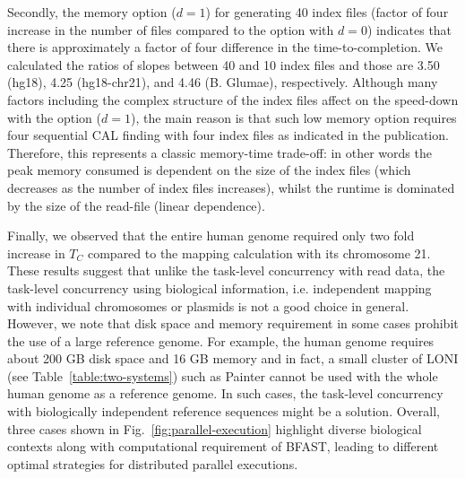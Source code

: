 \documentclass{cpeauth}
\begin{document}

Secondly, the memory option ($d=1$) for generating 40 index files
(factor of four increase in the number of files compared to the option with $d=0$) indicates that there is
approximately a factor of four difference in the time-to-completion.
We calculated the ratios of slopes between 40 and 10 index files and
those are 3.50 (hg18), 4.25 (hg18-chr21), and 4.46 (B. Glumae),
respectively.  
Although many factors including the complex structure of the index
files affect on the speed-down with the option ($d=1$), the main
reason is that such low memory option requires four sequential CAL
finding with four index files as indicated in the
publication\cite{bfast2009}.  Therefore, this represents a classic
memory-time trade-off: in other words the peak memory consumed is
dependent on the size of the index files (which decreases as the
number of index files increases), whilst the runtime is dominated by
the size of the read-file (linear dependence).

Finally, we observed that the entire human genome required only two fold increase in $T_C$ compared to the mapping calculation with its chromosome 21.  These results suggest that unlike the task-level concurrency with read data, the task-level concurrency using biological information, i.e. independent mapping with individual chromosomes or plasmids is not a good choice in general. However, we note that disk space and memory requirement in some cases prohibit the use of a large reference genome.  For example, the human genome requires about 200 GB disk space and 16 GB memory and in fact, a small cluster of LONI (see Table~\ref{table:two-systems}) such as Painter cannot be used with the whole human genome as a reference genome.   In such cases, the task-level concurrency with biologically independent reference sequences might be a solution.   Overall, three cases shown in
Fig.~\ref{fig:parallel-execution} highlight diverse biological
contexts along with computational requirement of BFAST, leading to different optimal strategies for distributed
parallel executions.

\end{document}
